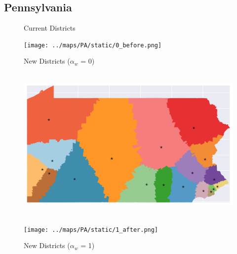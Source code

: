 \subsection{Pennsylvania}
\begin{figure}[htb!] \centering
\caption{ Current Districts }
\texttt{[image: ../maps/PA/static/0\_before.png]}
\caption{ New Districts ($\alpha_w$ = 0) }
\includegraphics[width=5in,height=3in,keepaspectratio]{../maps/PA/static/0_after.png}
\caption{ New Districts ($\alpha_w$ = 1) }
\texttt{[image: ../maps/PA/static/1\_after.png]}
\end{figure}

\clearpage
\newpage

